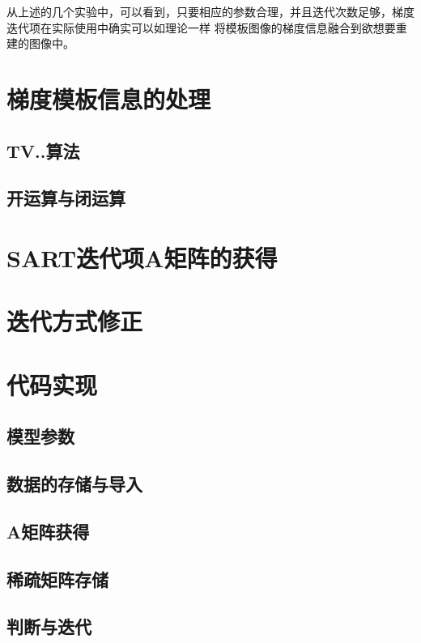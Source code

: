 从上述的几个实验中，可以看到，只要相应的参数合理，并且迭代次数足够，梯度迭代项在实际使用中确实可以如理论一样
将模板图像的梯度信息融合到欲想要重建的图像中。

\section{梯度模板信息的处理}
\subsection{TV..算法}
\subsection{开运算与闭运算}

\section{SART迭代项A矩阵的获得}

\section{迭代方式修正}

\section{代码实现}
\subsection{模型参数}
\subsection{数据的存储与导入}
\subsection{A矩阵获得}
\subsection{稀疏矩阵存储}
\subsection{判断与迭代}




